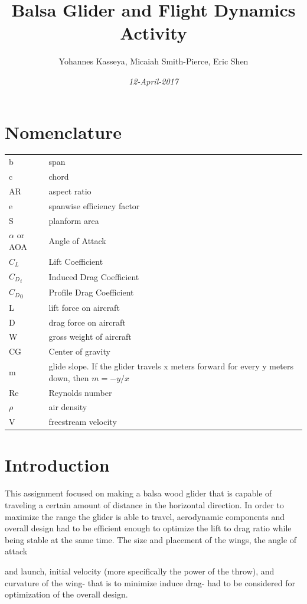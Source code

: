 \documentclass{article}
\title{Balsa Glider and Flight Dynamics Activity}
\author{Yohannes Kasseya, Micaiah Smith-Pierce, Eric Shen}
\date{\it{12-April-2017}}
\begin{document}
\maketitle

\section{Nomenclature}
\begin{tabular}{l l}
b & span \\
c & chord \\
AR & aspect ratio \\
e & spanwise efficiency factor\\
S & planform area \\
$\alpha$ or AOA & Angle of Attack \\
$C_L$ & Lift Coefficient \\
${C_D}_i$ & Induced Drag Coefficient \\
${C_D}_0$ & Profile Drag Coefficient \\
L & lift force on aircraft\\
D & drag force on aircraft\\
W & gross weight of aircraft\\
CG & Center of gravity\\
m & glide slope.  If the glider travels x meters forward for every y meters down, then $m = -y/x$\\
Re & Reynolds number\\
$\rho$ & air density\\
V & freestream velocity\\
\end{tabular}

\section{Introduction}
 This assignment focused on making a balsa wood glider that is capable of traveling a certain amount of distance in the horizontal direction. In order to maximize the range the glider is able to travel, aerodynamic components and overall design had to be efficient enough to optimize the lift to drag ratio while being stable at the same time. The size and placement of the wings, the angle of attack

and launch, initial velocity (more specifically the power of the throw), and curvature of the wing- that is to minimize induce drag- had to be considered for optimization of the overall design. 
\end{document}
